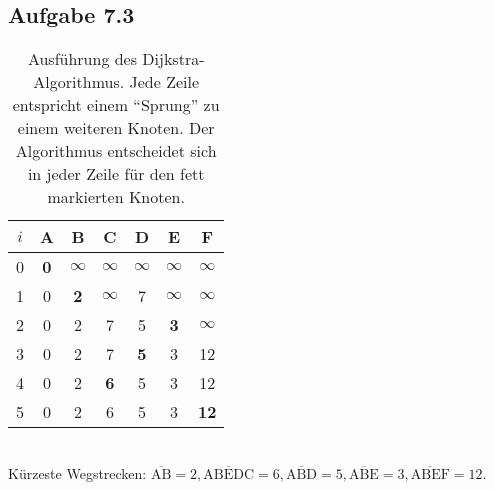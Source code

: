 \documentclass{article}
\begin{document}
    \subsection*{Aufgabe 7.3}
    \begin{table*}[h]
        \centering
        \begin{tabular}{c|cccccc}
            $i$ & A & B & C & D & E & F \\ \hline
            0   & \textbf{0} & $\infty$ & $\infty$ & $\infty$ & $\infty$ & $\infty$ \\
            1   & 0 & \textbf{2} & $\infty$ & 7 & $\infty$ & $\infty$ \\
            2   & 0 & 2 & 7 & 5 & \textbf{3} & $\infty$ \\
            3   & 0 & 2 & 7 & \textbf{5} & 3 & 12 \\
            4   & 0 & 2 & \textbf{6} & 5 & 3 & 12 \\
            5   & 0 & 2 & 6 & 5 & 3 & \textbf{12} \\
        \end{tabular}
        \caption{Ausführung des Dijkstra-Algorithmus. Jede Zeile entspricht einem "`Sprung"' zu einem weiteren Knoten. Der Algorithmus entscheidet sich in jeder Zeile für den fett markierten Knoten.}
    \end{table*}\hfill\\
    Kürzeste Wegstrecken: $\overline{\text{AB}} = 2, \overline{\text{ABEDC}} = 6, \overline{\text{ABD}} = 5, \overline{\text{ABE}} = 3, \overline{\text{ABEF}} = 12$.
\end{document}
